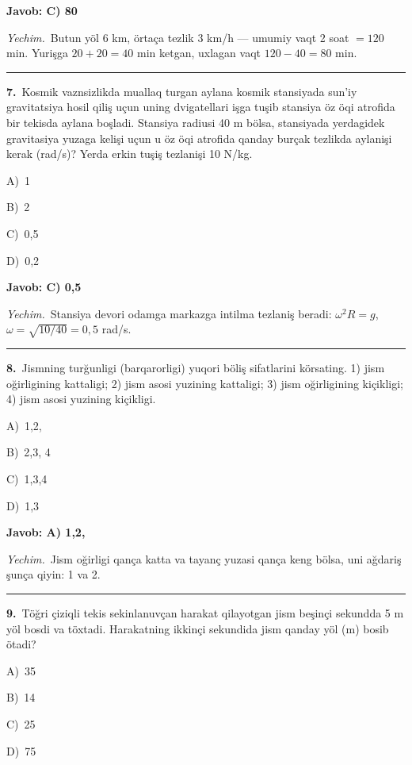 \documentclass[11pt,a4paper]{article}
\newcommand{\opt}[2]{\hspace*{4mm}#1)\ #2\par}
\begin{document}
\noindent\colorbox{gray!12}{\parbox{\dimexpr\linewidth-2\fboxsep}{\textbf{Javob: C) 80}}}\par\smallskip
\noindent\textit{Yechim.}\ Butun yöl 6 km, örtaça tezlik 3 km/h — umumiy vaqt 2 soat $=120$ min. Yurişga $20+20=40$ min ketgan, uxlagan vaqt $120-40=80$ min.\par\par\medskip\hrule\medskip
{}\noindent\begin{minipage}{\linewidth}
\textbf{7.}\ Kosmik vaznsizlikda muallaq turgan aylana kosmik stansiyada sun’iy gravitatsiya hosil qiliş uçun uning dvigatellari işga tuşib stansiya öz öqi atrofida bir tekisda aylana boşladi. Stansiya radiusi 40 m bölsa, stansiyada yerdagidek gravitasiya yuzaga kelişi uçun u öz öqi atrofida qanday burçak tezlikda aylanişi kerak (rad/s)? Yerda erkin tuşiş tezlanişi 10 N/kg.\par\smallskip
\opt{A}{1}
\opt{B}{2}
\opt{C}{0,5}
\opt{D}{0,2}
\end{minipage}\vspace{2pt}\par
\noindent\colorbox{gray!12}{\parbox{\dimexpr\linewidth-2\fboxsep}{\textbf{Javob: C) 0,5}}}\par\smallskip
\noindent\textit{Yechim.}\ Stansiya devori odamga markazga intilma tezlaniş beradi: $\omega^2R=g$, $\omega=\sqrt{10/40}=0{,}5$ rad/s.\par\par\medskip\hrule\medskip
{}\noindent\begin{minipage}{\linewidth}
\textbf{8.}\ Jismning turğunligi (barqarorligi) yuqori böliş sifatlarini körsating. 1) jism oğirligining kattaligi; 2) jism asosi yuzining kattaligi; 3) jism oğirligining kiçikligi; 4) jism asosi yuzining kiçikligi.\par\smallskip
\opt{A}{1,2,}
\opt{B}{2,3, 4}
\opt{C}{1,3,4}
\opt{D}{1,3}
\end{minipage}\vspace{2pt}\par
\noindent\colorbox{gray!12}{\parbox{\dimexpr\linewidth-2\fboxsep}{\textbf{Javob: A) 1,2,}}}\par\smallskip
\noindent\textit{Yechim.}\ Jism oğirligi qança katta va tayanç yuzasi qança keng bölsa, uni ağdariş şunça qiyin: 1 va 2.\par\par\medskip\hrule\medskip
{}\noindent\begin{minipage}{\linewidth}
\textbf{9.}\ Töğri çiziqli tekis sekinlanuvçan harakat qilayotgan jism beşinçi sekundda 5 m yöl bosdi va töxtadi. Harakatning ikkinçi sekundida jism qanday yöl (m) bosib ötadi?\par\smallskip
\opt{A}{35}
\opt{B}{14}
\opt{C}{25}
\opt{D}{75}
\end{minipage}\vspace{2pt}\par
\end{document}
